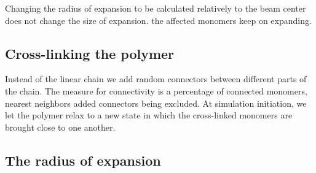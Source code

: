 \documentclass[12pt]{report}
\begin{document}
      Changing the radius of expansion to be calculated relatively to the beam center does not change the size of expansion. the affected monomers keep on expanding.
      
      
      
      
      
	\subsection{Cross-linking the polymer}
	Instead of the linear chain we add random connectors between different parts of the chain. The measure for connectivity is a percentage of connected monomers, nearest neighbors added connectors being excluded. 
	At simulation initiation, we let the polymer relax to a new state in which the cross-linked monomers are brought close to one another. 
      
	
	 \subsection{The radius of expansion}
	  
	 
	
	
\end{document}
